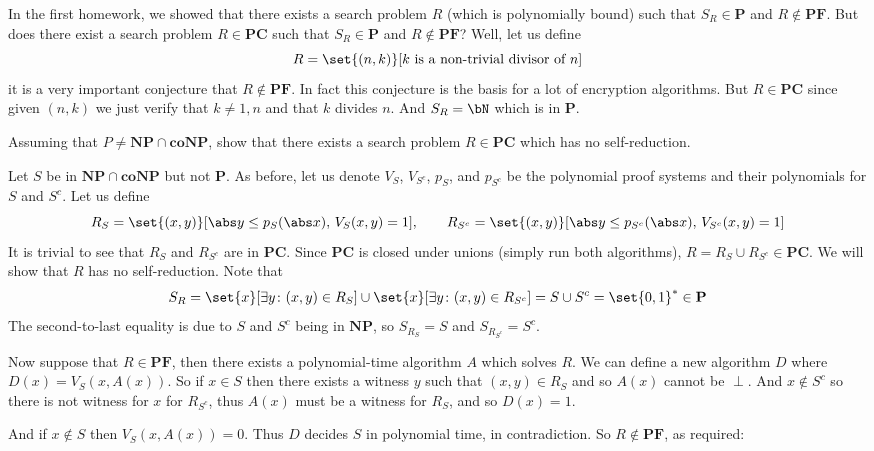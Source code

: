 \documentclass[10pt]{article}
\def\PF{\mathbf{PF}}
\def\PC{\mathbf{PC}}
\def\P{\mathbf{P}}
\def\NP{\mathbf{NP}}
\def\coNP{\mathbf{coNP}}
\begin{document}
In the first homework, we showed that there exists a search problem $R$ (which is polynomially bound) such that $S_R\in\P$ and $R\notin\PF$.
But does there exist a search problem $R\in\PC$ such that $S_R\in\P$ and $R\notin\PF$?
Well, let us define
\[ R = \set{(n,k)}[\text{$k$ is a non-trivial divisor of $n$}] \]
it is a very important conjecture that $R\notin\PF$.
In fact this conjecture is the basis for a lot of encryption algorithms.
But $R\in\PC$ since given $(n,k)$ we just verify that $k\neq1,n$ and that $k$ divides $n$.
And $S_R=\bN$ which is in $\P$.

\begin{exercise*}

    Assuming that $P\neq\NP\cap\coNP$, show that there exists a search problem $R\in\PC$ which has no self-reduction.

\end{exercise*}

Let $S$ be in $\NP\cap\coNP$ but not $\P$.
As before, let us denote $V_S$, $V_{S^c}$, $p_S$, and $p_{S^c}$ be the polynomial proof systems and their polynomials for $S$ and $S^c$.
Let us define
\[ R_S = \set{(x,y)}[\abs y\leq p_S(\abs x),\, V_S(x,y)=1],\qquad R_{S^c} = \set{(x,y)}[\abs y\leq p_{S^c}(\abs x),\, V_{S^c}(x,y)=1] \]
It is trivial to see that $R_S$ and $R_{S^c}$ are in $\PC$.
Since $\PC$ is closed under unions (simply run both algorithms), $R=R_S\cup R_{S^c}\in\PC$.
We will show that $R$ has no self-reduction.
Note that
\[ S_R = \set{x}[\exists y\colon (x,y)\in R_S]\cup\set{x}[\exists y\colon (x,y)\in R_{S^c}] = S\cup S^c = \set{0,1}^* \in \P \]
The second-to-last equality is due to $S$ and $S^c$ being in $\NP$, so $S_{R_S}=S$ and $S_{R_{S^c}}=S^c$.

Now suppose that $R\in\PF$, then there exists a polynomial-time algorithm $A$ which solves $R$.
We can define a new algorithm $D$ where $D(x)=V_S(x,A(x))$.
So if $x\in S$ then there exists a witness $y$ such that $(x,y)\in R_S$ and so $A(x)$ cannot be $\perp$.
And $x\notin S^c$ so there is not witness for $x$ for $R_{S^c}$, thus $A(x)$ must be a witness for $R_S$, and so $D(x)=1$.

And if $x\notin S$ then $V_S(x,A(x))=0$.
Thus $D$ decides $S$ in polynomial time, in contradiction.
So $R\notin\PF$, as required:
\end{document}
